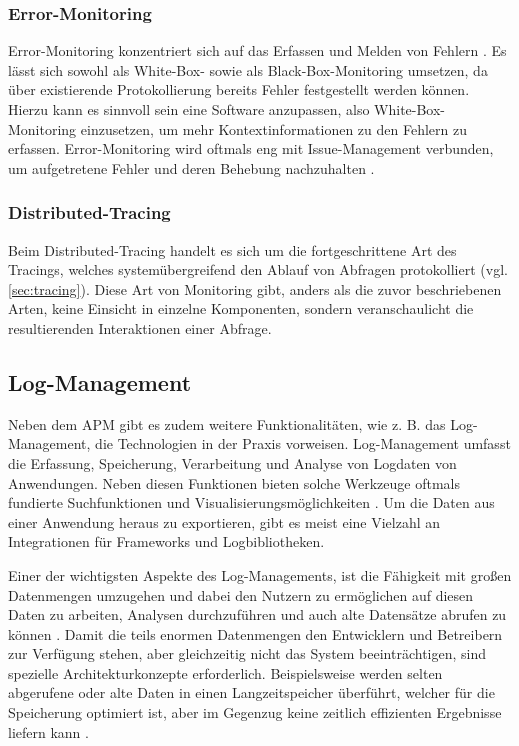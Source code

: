 \subsubsection{Error-Monitoring}

Error-Monitoring konzentriert sich auf das Erfassen und Melden von Fehlern \cite{CrashbinCrashMonitoring}. Es lässt sich sowohl als White-Box- sowie als Black-Box-Monitoring umsetzen, da über existierende Protokollierung bereits Fehler festgestellt werden können. Hierzu kann es sinnvoll sein eine Software anzupassen, also White-Box-Monitoring einzusetzen, um mehr Kontextinformationen zu den Fehlern zu erfassen. Error-Monitoring wird oftmals eng mit Issue-Management verbunden, um aufgetretene Fehler und deren Behebung nachzuhalten \cite{CrashbinCrashMonitoring}.

\subsubsection{Distributed-Tracing}

Beim Distributed-Tracing handelt es sich um die fortgeschrittene Art des Tracings, welches systemübergreifend den Ablauf von Abfragen protokolliert (vgl. \autoref{sec:tracing}). Diese Art von Monitoring gibt, anders als die zuvor beschriebenen Arten, keine Einsicht in einzelne Komponenten, sondern veranschaulicht die resultierenden Interaktionen einer Abfrage.

\subsection{Log-Management}

Neben dem APM gibt es zudem weitere Funktionalitäten, wie z. B. das Log-Management, die Technologien in der Praxis vorweisen. Log-Management umfasst die Erfassung, Speicherung, Verarbeitung und Analyse von Logdaten von Anwendungen. Neben diesen Funktionen bieten solche Werkzeuge oftmals fundierte Suchfunktionen und Visualisierungsmöglichkeiten \cite{DesignLogManagementSystem}. Um die Daten aus einer Anwendung heraus zu exportieren, gibt es meist eine Vielzahl an Integrationen für Frameworks und Logbibliotheken.

Einer der wichtigsten Aspekte des Log-Managements, ist die Fähigkeit mit großen Datenmengen umzugehen und dabei den Nutzern zu ermöglichen auf diesen Daten zu arbeiten, Analysen durchzuführen und auch alte Datensätze abrufen zu können \cite{LoggingAndLogManagement}. Damit die teils enormen Datenmengen den Entwicklern und Betreibern zur Verfügung stehen, aber gleichzeitig nicht das System beeinträchtigen, sind spezielle Architekturkonzepte erforderlich. Beispielsweise werden selten abgerufene oder alte Daten in einen Langzeitspeicher überführt, welcher für die Speicherung optimiert ist, aber im Gegenzug keine zeitlich effizienten Ergebnisse liefern kann \cite{LoggingAndLogManagement}.

